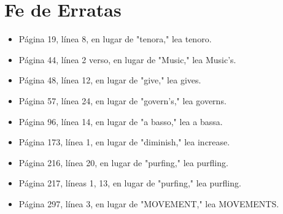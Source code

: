 \section*{Fe de Erratas}

\begin{itemize}
    \item Página 19, línea 8, en lugar de "tenora," lea tenoro.
    \item Página 44, línea 2 verso, en lugar de "Music," lea Music's.
    \item Página 48, línea 12, en lugar de "give," lea gives.
    \item Página 57, línea 24, en lugar de "govern's," lea governs.
    \item Página 96, línea 14, en lugar de "a basso," lea a bassa.
    \item Página 173, línea 1, en lugar de "diminish," lea increase.
    \item Página 216, línea 20, en lugar de "purfing," lea purfling.
    \item Página 217, líneas 1, 13, en lugar de "purfing," lea purfling.
    \item Página 297, línea 3, en lugar de "MOVEMENT," lea MOVEMENTS.
\end{itemize}